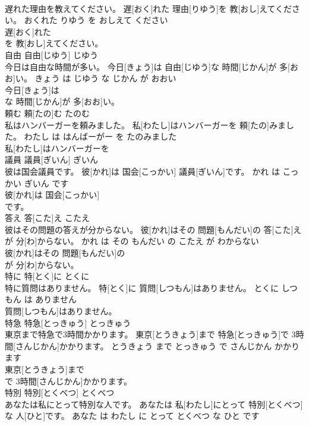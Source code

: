 \documentclass[8pt]{extreport}
\begin{document}
\begin{CJK}{UTF8}{min}
\\	遅れた理由を教えてください。	遅[おく]れた 理由[りゆう]を 教[おし]えてください。	おくれた りゆう を おしえて ください	
\\	遅[おく]れた
\\	を 教[おし]えてください。			
\\	自由	自由[じゆう]	じゆう	
\\	今日は自由な時間が多い。	今日[きょう]は 自由[じゆう]な 時間[じかん]が 多[おお]い。	きょう は じゆう な じかん が おおい	
\\	今日[きょう]は
\\	な 時間[じかん]が 多[おお]い。			
\\	頼む	頼[たの]む	たのむ	
\\	私はハンバーガーを頼みました。	私[わたし]はハンバーガーを 頼[たの]みました。	わたし は はんばーがー を たのみました	
\\	私[わたし]はハンバーガーを
\\	議員	議員[ぎいん]	ぎいん	
\\	彼は国会議員です。	彼[かれ]は 国会[こっかい] 議員[ぎいん]です。	かれ は こっかい ぎいん です	
\\	彼[かれ]は 国会[こっかい]
\\	です。			
\\	答え	答[こた]え	こたえ	
\\	彼はその問題の答えが分からない。	彼[かれ]はその 問題[もんだい]の 答[こた]えが 分[わ]からない。	かれ は その もんだい の こたえ が わからない	
\\	彼[かれ]はその 問題[もんだい]の
\\	が 分[わ]からない。			
\\	特に	特[とく]に	とくに	
\\	特に質問はありません。	特[とく]に 質問[しつもん]はありません。	とくに しつもん は ありません	
\\	質問[しつもん]はありません。			
\\	特急	特急[とっきゅう]	とっきゅう	
\\	東京まで特急で3時間かかります。	東京[とうきょう]まで 特急[とっきゅう]で 3時間[さんじかん]かかります。	とうきょう まで とっきゅう で さんじかん かかります	
\\	東京[とうきょう]まで
\\	で 3時間[さんじかん]かかります。			
\\	特別	特別[とくべつ]	とくべつ	
\\	あなたは私にとって特別な人です。	あなたは 私[わたし]にとって 特別[とくべつ]な 人[ひと]です。	あなた は わたし に とって とくべつ な ひと です	

\end{CJK}
\end{document}
